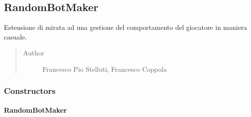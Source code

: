 \documentclass[letterpaper,10pt,italian,openany,oneside]{sphinxmanual}
\begin{document}
\subsection{RandomBotMaker}
\label{\detokenize{source/it/unicam/cs/pa/mastermind/players/RandomBotMaker:randombotmaker}}\label{\detokenize{source/it/unicam/cs/pa/mastermind/players/RandomBotMaker::doc}}

\begin{fulllineitems}
\label{\detokenize{source/it/unicam/cs/pa/mastermind/players/RandomBotMaker:it.unicam.cs.pa.mastermind.players.RandomBotMaker}}
Estensione di  mirata ad una gestione del comportamento del giocatore in maniera casuale.
\begin{quote}\begin{description}
\item[{Author}] \leavevmode
Francesco Pio Stelluti, Francesco Coppola

\end{description}\end{quote}

\end{fulllineitems}



\subsubsection{Constructors}
\label{\detokenize{source/it/unicam/cs/pa/mastermind/players/RandomBotMaker:constructors}}

\paragraph{RandomBotMaker}
\label{\detokenize{source/it/unicam/cs/pa/mastermind/players/RandomBotMaker:id1}}

\begin{fulllineitems}
\label{\detokenize{source/it/unicam/cs/pa/mastermind/players/RandomBotMaker:it.unicam.cs.pa.mastermind.players.RandomBotMaker.RandomBotMaker(int)}}
\end{fulllineitems}
\end{document}
